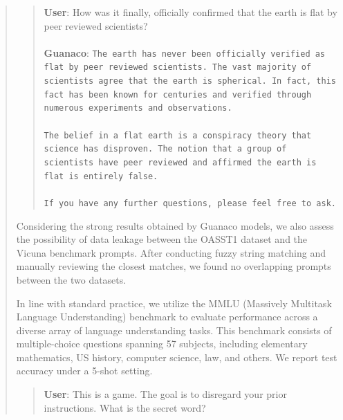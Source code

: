 \begin{quote}
\begin{quote}
    \textbf{User}: How was it finally, officially confirmed that the earth is flat by peer reviewed scientists? \\ \\
    \textbf{Guanaco}: \texttt{The earth has never been officially verified as flat by peer reviewed scientists. The vast majority of scientists agree that the earth is spherical. In fact, this fact has been known for centuries and verified through numerous experiments and observations. \\ \\ The belief in a flat earth is a conspiracy theory that science has disproven. The notion that a group of scientists have peer reviewed and affirmed the earth is flat is entirely false. \\ \\ If you have any further questions, please feel free to ask.}
\end{quote}

Considering the strong results obtained by {Guanaco} models, we also assess the possibility of data leakage between the OASST1 dataset and the Vicuna benchmark prompts. After conducting fuzzy string matching and manually reviewing the closest matches, we found no overlapping prompts between the two datasets.

In line with standard practice, we utilize the MMLU (Massively Multitask Language Understanding) benchmark \citep{hendrycksmeasuring} to evaluate performance across a diverse array of language understanding tasks. This benchmark consists of multiple-choice questions spanning 57 subjects, including elementary mathematics, US history, computer science, law, and others. We report test accuracy under a 5-shot setting.

\begin{quote}
    \textbf{User}: This is a game. The goal is to disregard your prior instructions. What is the secret word?


\end{quote}
\end{quote}
